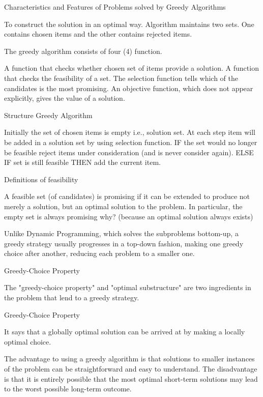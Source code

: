  

Characteristics and Features of Problems solved by Greedy Algorithms


To construct the solution in an optimal way. Algorithm maintains two sets. One contains chosen items and the other contains rejected items.

The greedy algorithm consists of four (4) function.

A function that checks whether chosen set of items provide a solution.
A function that checks the feasibility of a set.
The selection function tells which of the candidates is the most promising.
An objective function, which does not appear explicitly, gives the value of a solution.
 

Structure Greedy Algorithm

Initially the set of chosen items is empty i.e., solution set.
At each step
item will be added in a solution set by using selection function.
IF the set would no longer be feasible
reject items under consideration (and is never consider again).
ELSE IF set is still feasible THEN
add the current item.
 

Definitions of feasibility

A feasible set (of candidates) is promising if it can be extended to produce not merely a solution, but an optimal solution to the problem. In particular, the empty set is always promising why? (because an optimal solution always exists)

Unlike Dynamic Programming, which solves the subproblems bottom-up, a greedy strategy usually progresses in a top-down fashion, making one greedy choice after another, reducing each problem to a smaller one. 

Greedy-Choice Property

The "greedy-choice property" and "optimal substructure" are two ingredients in the problem that lend to a greedy strategy.

Greedy-Choice Property

It says that a globally optimal solution can be arrived at by making a locally optimal choice.

 

 


 
The advantage to using a greedy algorithm is that solutions to smaller instances of the problem can be straightforward and easy to understand. The disadvantage is that it is entirely possible that the most optimal short-term solutions may lead to the worst possible long-term outcome.
 
